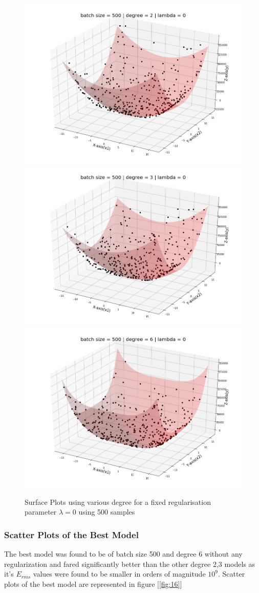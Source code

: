\begin{figure}[!ht] 
    \includegraphics[width=.30\textwidth]{Task 2 Images/surfaceplot_batch500_deg2_lamb0.png}\hfill
    \includegraphics[width=.30\textwidth]{Task 2 Images/surfaceplot_batch500_deg3_lamb0.png}\hfill
    \includegraphics[width=.30\textwidth]{Task 2 Images/surfaceplot_batch500_deg6_lamb0.png}
    \caption{Surface Plots using various degree for a fixed regularisation parameter $\lambda = 0$ using 500 samples}
    \label{fig:15}
\end{figure}

\newpage
\subsubsection{Scatter Plots of the Best Model}
The best model was found to be of batch size 500 and degree 6 without any regularization and fared significantly better than the other degree 2,3 models as it's $E_{rms}$ values were found to be smaller in orders of magnitude $10^9$. Scatter plots of the best model are represented in figure [\ref{fig:16}]



